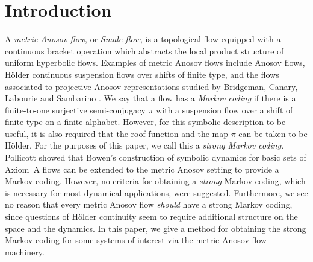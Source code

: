 \documentclass[11pt]{article}
\theoremstyle{definition}
\numberwithin{equation}{section}
\begin{document}
\section{Introduction}

A \emph{metric Anosov flow}, or \emph{Smale flow}, is a topological flow equipped with a continuous bracket operation which abstracts the local product structure of uniform hyperbolic flows. Examples of metric Anosov flows include Anosov flows, Hölder continuous suspension flows over shifts of finite type, and the flows associated to projective Anosov representations studied by Bridgeman, Canary, Labourie and Sambarino \cite{bcls, BC17}. We say that a flow has a \emph{Markov coding} if there is a finite-to-one surjective semi-conjugacy $\pi$ with a suspension flow over a shift of finite type on a finite alphabet. However, for this symbolic description to be useful, it is also required that the roof function and the map $\pi$ can be taken to be Hölder. For the purposes of this paper, we call this a \emph{strong Markov coding}. Pollicott showed that Bowen's construction of symbolic dynamics for basic sets of Axiom~A flows can be extended to the metric Anosov setting \cite{pollicott} to provide a Markov coding. However, no criteria for obtaining a \emph{strong} Markov coding, which is necessary for most dynamical applications, were suggested. Furthermore, we see no reason that every metric Anosov flow \emph{should} have a strong Markov coding, since questions of Hölder continuity seem to require additional structure on the space and the dynamics. In this paper, we give a method for obtaining the strong Markov coding for some systems of interest via the metric Anosov flow machinery.
\end{document}
